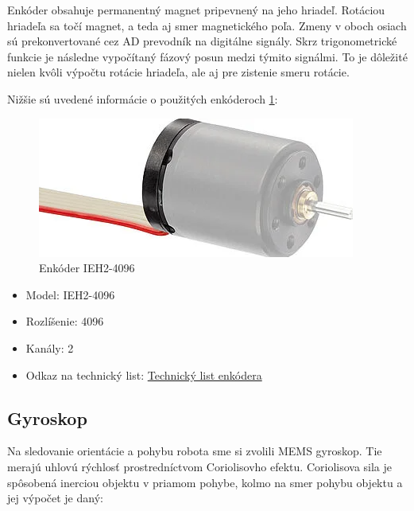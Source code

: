 Enkóder obsahuje permanentný magnet pripevnený na jeho hriadeľ. Rotáciou hriadeľa sa točí magnet, a teda aj smer magnetického poľa. Zmeny v oboch osiach sú prekonvertované cez AD prevodník na digitálne signály. Skrz trigonometrické funkcie je následne vypočítaný fázový posun medzi týmito signálmi. To je dôležité nielen kvôli výpočtu rotácie hriadeľa, ale aj pre zistenie smeru rotácie.

Nižšie sú uvedené informácie o použitých enkóderoch \ref{fig:encoder}:

\begin{figure}[!htbp]
		\centering
		\includegraphics[scale=0.8]{includes/images/encoder.png}
		\caption{Enkóder IEH2-4096}
		\label{fig:encoder}
\end{figure}

\begin{itemize}
  \item Model: IEH2-4096
  \item Rozlíšenie: 4096
  \item Kanály: 2
  \item Odkaz na technický list: \href{https://www.faulhaber.com/fileadmin/Import/Media/EN_IEH2-4096_DFF.pdf}{Technický list enkódera}
\end{itemize}

\subsection{Gyroskop}

Na sledovanie orientácie a pohybu robota sme si zvolili MEMS gyroskop. Tie merajú uhlovú rýchlosť prostredníctvom Coriolisovho efektu. Coriolisova sila je spôsobená inerciou objektu v priamom pohybe, kolmo na smer pohybu objektu a jej výpočet je daný: 

